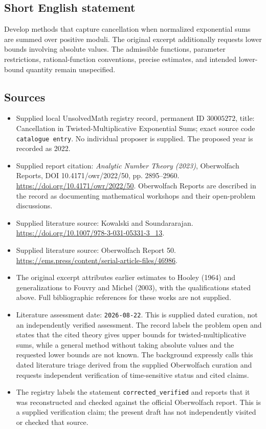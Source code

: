 \documentclass[11pt]{article}
\begin{document}
\subsection{Short English statement}
Develop methods that capture cancellation when normalized exponential sums are summed over positive moduli. The original excerpt additionally requests lower bounds involving absolute values. The admissible functions, parameter restrictions, rational-function conventions, precise estimates, and intended lower-bound quantity remain unspecified.
\subsection{Sources}
\begin{itemize}
\item Supplied local UnsolvedMath registry record, permanent ID \(30005272\), title: Cancellation in Twisted-Multiplicative Exponential Sums; exact source code \texttt{catalogue entry}. No individual proposer is supplied. The proposed year is recorded as 2022.
\item Supplied report citation: \emph{Analytic Number Theory (2023)}, Oberwolfach Reports, DOI 10.4171/owr/2022/50, pp. 2895--2960. \url{https://doi.org/10.4171/owr/2022/50}. Oberwolfach Reports are described in the record as documenting mathematical workshops and their open-problem discussions.
\item Supplied literature source: Kowalski and Soundararajan. \url{https://doi.org/10.1007/978-3-031-05331-3_13}.
\item Supplied literature source: Oberwolfach Report 50. \url{https://ems.press/content/serial-article-files/46986}.
\item The original excerpt attributes earlier estimates to Hooley (1964) and generalizations to Fouvry and Michel (2003), with the qualifications stated above. Full bibliographic references for these works are not supplied.
\item Literature assessment date: \texttt{2026-08-22}. This is supplied dated curation, not an independently verified assessment. The record labels the problem open and states that the cited theory gives upper bounds for twisted-multiplicative sums, while a general method without taking absolute values and the requested lower bounds are not known. The background expressly calls this dated literature triage derived from the supplied Oberwolfach curation and requests independent verification of time-sensitive status and cited claims.
\item The registry labels the statement \texttt{corrected\_verified} and reports that it was reconstructed and checked against the official Oberwolfach report. This is a supplied verification claim; the present draft has not independently visited or checked that source.
\end{itemize}
\end{document}
